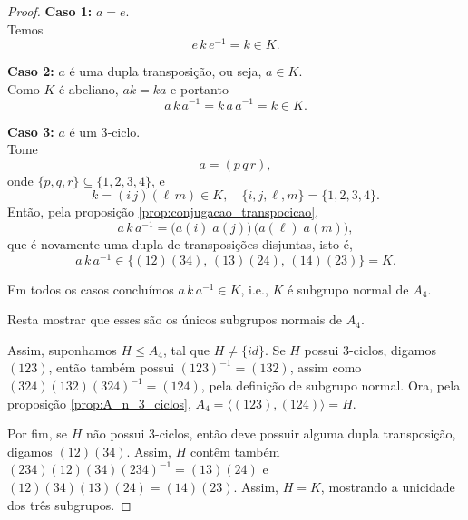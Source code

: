 \documentclass[11pt,openany]{book}
\newcommand{\gen}[1]{\ensuremath{\langle #1\rangle}}
\begin{document}
\begin{proof}
    \medskip
    \textbf{Caso 1:} \(a = e\).\\
    Temos
    \[
    e\,k\,e^{-1} = k \in K.
    \]

    \medskip
    \textbf{Caso 2:} \(a\) é uma dupla transposição, ou seja, \(a\in K\).\\
    Como \(K\) é abeliano, \(a k = k a\) e portanto
    \[
    a\,k\,a^{-1} = k\,a\,a^{-1} = k \in K.
    \]

    \medskip
    \textbf{Caso 3:} \(a\) é um 3‑ciclo.\\
    Tome
    \[
    a = (p\,q\,r),
    \]
    onde \(\{p,q,r\}\subseteq\{1,2,3,4\}\), e
    \[
    k = (i\,j)(\ell\,m)\in K,
    \quad
    \{i,j,\ell,m\}=\{1,2,3,4\}.
    \]
    Então, pela proposição \ref{prop:conjugacao_transpocicao},
    \[
    a\,k\,a^{-1}
    = \bigl(a(i)\;a(j)\bigr)\,\bigl(a(\ell)\;a(m)\bigr),
    \]
    que é novamente uma dupla de transposições disjuntas, isto é,
    \[
    a\,k\,a^{-1}\in\{(12)(34),\,(13)(24),\,(14)(23)\} = K.
    \]

    \smallskip
    Em todos os casos concluímos \(a\,k\,a^{-1}\in K\), i.e., $K$ é subgrupo normal de $A_4$.

    Resta mostrar que esses são os únicos subgrupos normais de $A_4$.

    Assim, suponhamos $H \leq A_4$, tal que $H \not= \{id\}$. Se $H$ possui 3-ciclos, digamos $(123)$, então também possui $(123)^{-1} = (132)$, assim como $(324)(132)(324)^{-1} = (124)$, pela definição de subgrupo normal.
    Ora, pela proposição \ref{prop:A_n_3_ciclos}, $A_4 = \gen{(123),(124)} = H$.

    Por fim, se $H$ não possui 3-ciclos, então deve possuir alguma dupla transposição, digamos $(12)(34)$. Assim, $H$ contêm também $(234)(12)(34)(234)^{-1} = (13)(24)$ e $(12)(34)(13)(24) = (14)(23)$. Assim, $H = K$, mostrando a unicidade dos três subgrupos.
\end{proof}
\end{document}
